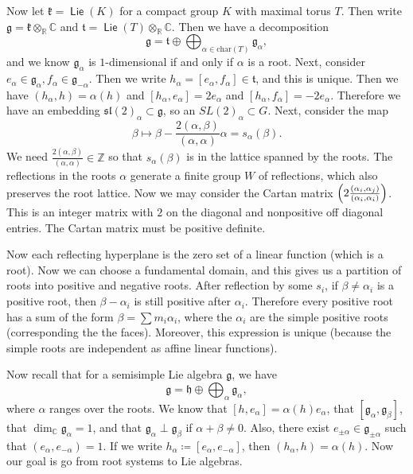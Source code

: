 \documentclass[leqno, openany]{memoir}
\theoremstyle{definition}
\theoremstyle{remark}
\theoremstyle{plain}
\theoremstyle{definition}
\theoremstyle{remark}
\newcommand{\R}{\mathbb{R}}
\newcommand{\C}{\mathbb{C}}
\newcommand{\Z}{\mathbb{Z}}
\newcommand{\mf}[1]{\mathfrak{#1}}
\newcommand{\mr}[1]{\mathrm{#1}}
\DeclareMathOperator{\Lie}{\mathsf{Lie}}
\begin{document}
Now let $\mf{k} = \Lie(K)$ for a compact group $K$ with maximal torus $T$. Then write $\mf{g} = \mf{k} \otimes_{\R} \C$ and $\mf{t} = \Lie(T) \otimes_{\R} \C$. Then we have a decomposition 
\[ \mf{g} = \mf{t} \oplus \bigoplus_{\alpha \in \mr{char}(T)} \mf{g}_{\alpha}, \]
and we know $\mf{g}_{\alpha}$ is $1$-dimensional if and only if $\alpha$ is a root. Next, consider $e_{\alpha} \in \mf{g}_{\alpha}, f_{\alpha} \in \mf{g}_{-\alpha}$. Then we write $h_{\alpha} = [e_{\alpha}, f_{\alpha}] \in \mf{t}$, and this is unique. Then we have $(h_{\alpha}, h) = \alpha(h)$ and $[h_{\alpha}, e_{\alpha}] = 2 e_{\alpha}$ and $[h_{\alpha}, f_{\alpha}] = -2 e_{\alpha}$. Therefore we have an embedding ${\mf{sl}(2)}_{\alpha} \subset \mf{g}$, so an ${SL(2)}_{\alpha} \subset G$. Next, consider the map 
\[ \beta \mapsto \beta - \frac{2(\alpha, \beta)}{(\alpha, \alpha)} \alpha = s_{\alpha}(\beta). \] 
We need $\frac{2(\alpha,\beta)}{(\alpha, \alpha)} \in \Z$ so that $s_{\alpha}(\beta)$ is in the lattice spanned by the roots. The reflections in the roots $\alpha$ generate a finite group $W$ of reflections, which also preserves the root lattice. Now we may consider the Cartan matrix $\qty(2 \frac{(\alpha_i,\alpha_j)}{(\alpha_i, \alpha_i)})$. This is an integer matrix with $2$ on the diagonal and nonpositive off diagonal entries. The Cartan matrix must be positive definite.

Now each reflecting hyperplane is the zero set of a linear function (which is a root). Now we can choose a fundamental domain, and this gives us a partition of roots into positive and negative roots. After reflection by some $s_i$, if $\beta \neq \alpha_i$ is a positive root, then $\beta - \alpha_i$ is still positive after $\alpha_i$. Therefore every positive root has a sum of the form $\beta = \sum m_i \alpha_i$, where the $\alpha_i$ are the simple positive roots (corresponding the the faces). Moreover, this expression is unique (because the simple roots are independent as affine linear functions).

Now recall that for a semisimple Lie algebra $\mf{g}$, we have
\[ \mf{g} = \mf{h} \oplus \bigoplus_{\alpha} \mf{g}_{\alpha}, \]
where $\alpha$ ranges over the roots. We know that $[h,e_{\alpha}] = \alpha(h) e_{\alpha}$, that $[\mf{g}_{\alpha}, \mf{g}_{\beta}]$, that $\dim_{\C} \mf{g}_{\alpha} = 1$, and that $\mf{g}_{\alpha} \perp \mf{g}_{\beta}$ if $\alpha + \beta \neq 0$. Also, there exist $e_{\pm \alpha} \in \mf{g}_{\pm \alpha}$ such that $(e_{\alpha}, e_{-\alpha}) = 1$. If we write $h_{\alpha} \coloneqq [e_{\alpha}, e_{-\alpha}]$, then $(h_{\alpha}, h) = \alpha(h)$. Now our goal is go from root systems to Lie algebras.
\end{document}
